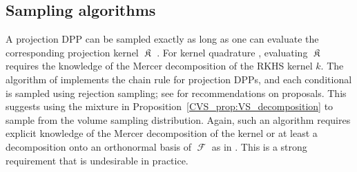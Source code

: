 \documentclass[twoside,11pt]{book}
\numberwithin{theorem}{chapter}
\numberwithin{definition}{chapter}
\numberwithin{proposition}{chapter}
\numberwithin{corollary}{chapter}
\numberwithin{example}{chapter}
\numberwithin{lemma}{chapter}
\DeclareMathOperator*{\KDPP}{\mathfrak{K}}
\DeclareMathOperator{\F}{\mathcal{F}}
\begin{document}
\subsection{Sampling algorithms}


A projection DPP can be sampled exactly as long as one can evaluate the corresponding projection kernel $\KDPP$ \citep{HoKrPeVi06}. For kernel quadrature \citep{BeBaCh19}, evaluating $\KDPP$ requires the knowledge of the Mercer decomposition of the RKHS kernel $k$. The algorithm of \cite{HoKrPeVi06} implements the chain rule for projection DPPs, and each conditional is sampled using rejection sampling; see \cite{GaBaVa19} for recommendations on proposals. This suggests using the mixture in Proposition~\ref{CVS_prop:VS_decomposition} to sample from the volume sampling distribution.
Again, such an algorithm requires explicit knowledge of the Mercer decomposition of the kernel or at least a decomposition onto an orthonormal basis of $\F$ as in \citep{KaSaTa19}. This is a strong requirement that is undesirable in practice.
\end{document}
